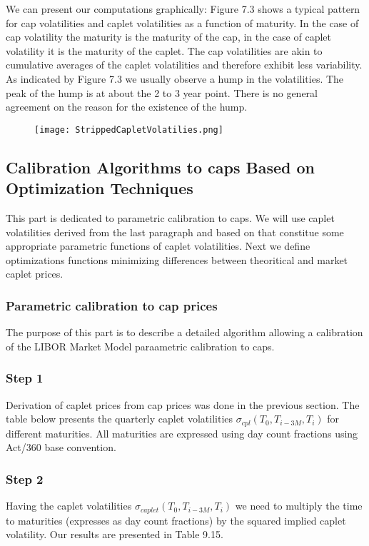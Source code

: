 \documentclass[11pt]{article}
\numberwithin{equation}{subsection}
\begin{document}
We can present our computations graphically:
Figure 7.3 shows a typical pattern for cap volatilities and caplet volatilities as a function
of maturity. In the case of cap volatility the maturity is the maturity of the cap, in the case
of caplet volatility it is the maturity of the caplet. The cap volatilities are akin to cumulative
averages of the caplet volatilities and therefore exhibit less variability. As indicated by
Figure 7.3 we usually observe a hump in the volatilities. The peak of the hump is at about
the 2 to 3 year point. There is no general agreement on the reason for the existence of
the hump.

\begin{figure}[H]
	\texttt{[image: StrippedCapletVolatilies.png]}
\end{figure}


\subsection{Calibration Algorithms to caps Based on Optimization Techniques}
This part is dedicated to parametric calibration to caps. We will use caplet volatilities derived from the last paragraph and based on that constitue some appropriate parametric functions of caplet volatilities. Next we define optimizations functions minimizing differences between theoritical and market caplet prices.


\subsubsection{Parametric calibration to cap prices}
The purpose of this part is to describe a detailed algorithm allowing a calibration of the LIBOR Market Model paraametric calibration to caps.

\subsubsection*{Step 1}
Derivation of caplet prices from cap prices was done in the previous section.
The table below presents the quarterly caplet volatilities \(\sigma_{cpl}(T_{0}, T_{i-3M}, T_{i})\) for
different maturities. All maturities are expressed using day count fractions using Act/360
base convention.

\subsubsection*{Step 2}
Having the caplet volatilities \(\sigma_{caplet}(T_{0}, T_{i-3M}, T_{i})\) we need to multiply the time to maturities
(expresses as day count fractions) by the squared implied caplet volatility. Our results are
presented in Table 9.15.
\end{document}
